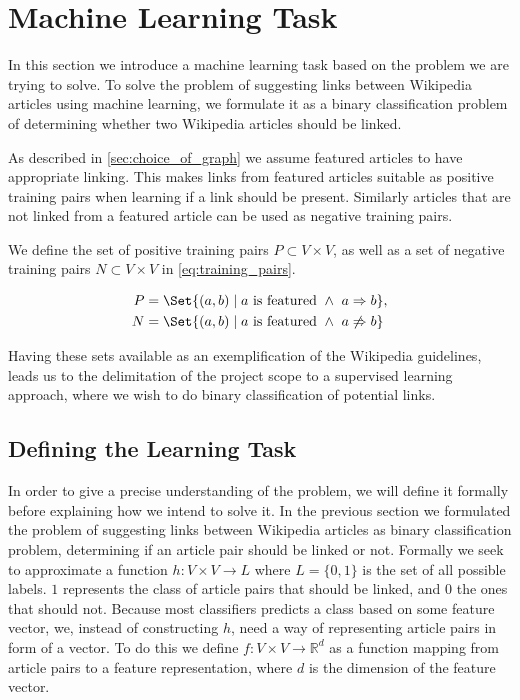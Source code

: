 \section{Machine Learning Task}\label{sec:machine_learning_task}
In this section we introduce a machine learning task based on the problem we are trying to solve. To solve the problem of suggesting links between Wikipedia articles using machine learning, we formulate it as a binary classification problem of determining whether two Wikipedia articles should be linked.

As described in \cref{sec:choice_of_graph} we assume featured articles to have appropriate linking. This makes links from featured articles suitable as positive training pairs when learning if a link should be present. Similarly articles that are not linked from a featured article can be used as negative training pairs.

We define the set of positive training pairs $P \subset V \times V$, as well as a set of negative training pairs $N \subset V \times V$ in \cref{eq:training_pairs}.

\begin{equation}
\label{eq:training_pairs}
  \begin{split}
    P &= \Set{(a,b) \mid a\text{ is featured}\ \wedge\ a \Rightarrow b}, \\
    N &= \Set{(a,b) \mid a\text{ is featured}\ \wedge\ a \not\Rightarrow b}
  \end{split}
\end{equation}

Having these sets available as an exemplification of the Wikipedia guidelines, leads us to the delimitation of the project scope to a supervised learning approach, where we wish to do binary classification of potential links.


\subsection{Defining the Learning Task}\label{sec:ml_def}
In order to give a precise understanding of the problem, we will define it formally before explaining how we intend to solve it.
In the previous section we formulated the problem of suggesting links between Wikipedia articles as binary classification problem, determining if an article pair should be linked or not. Formally we seek to approximate a function $h: V \times V \to L$ where $L=\{0,1\}$ is the set of all possible labels. $1$ represents the class of article pairs that should be linked, and $0$ the ones that should not.
Because most classifiers predicts a class based on some feature vector, we, instead of constructing $h$, need a way of representing article pairs in form of a vector. To do this we define $f: V\times V \to \mathbb{R}^d$ as a function mapping from article pairs to a feature representation, where $d$ is the dimension of the feature vector. 

